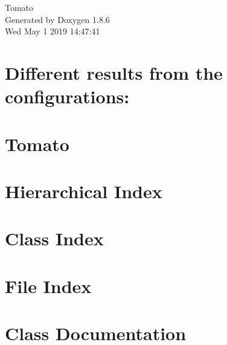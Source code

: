 \documentclass[twoside]{book}
\newcommand{\clearemptydoublepage}{%
  \newpage{\pagestyle{empty}\cleardoublepage}%
}
\begin{document}
\hypersetup{pageanchor=false}
\begin{titlepage}
\vspace*{7cm}
\begin{center}%
{\Large Tomato }\\
\vspace*{1cm}
{\large Generated by Doxygen 1.8.6}\\
\vspace*{0.5cm}
{\small Wed May 1 2019 14:47:41}\\
\end{center}
\end{titlepage}
\clearemptydoublepage
\tableofcontents
\clearemptydoublepage
{}
\hypersetup{pageanchor=true}

\chapter{Different results from the configurations\-:}
\label{md_notepad}
\hypertarget{md_notepad}{}

\chapter{Tomato}
\label{md__r_e_a_d_m_e}
\hypertarget{md__r_e_a_d_m_e}{}

\chapter{Hierarchical Index}

\chapter{Class Index}

\chapter{File Index}

\chapter{Class Documentation}
























\end{document}
